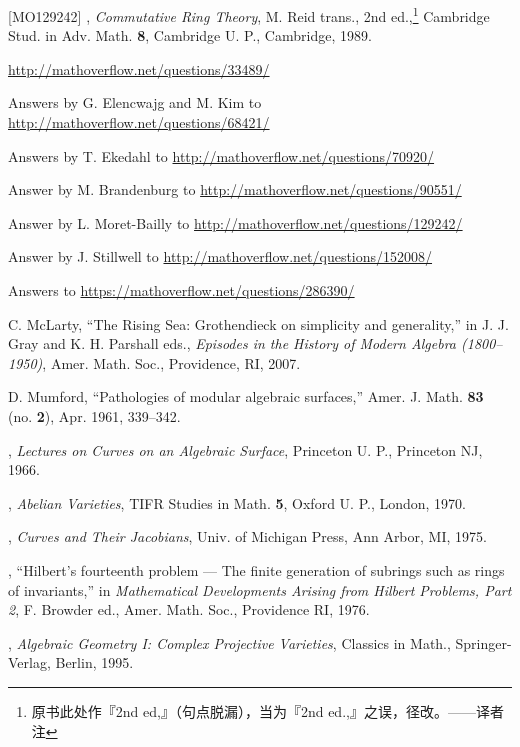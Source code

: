 \begin{thebibliography}{[MO129242]}
\sameauthor, \emph{Commutative Ring Theory}, M. Reid trans., 2nd ed.,\footnote
{原书此处作『2nd ed,』（句点脱漏），当为『2nd ed.,』之误，径改。——译者注}
Cambridge Stud. in Adv. Math. \textbf{8}, Cambridge U. P., Cambridge, 1989.

\url{http://mathoverflow.net/questions/33489/}

Answers by G. Elencwajg and M. Kim to
\url{http://mathoverflow.net/questions/68421/}

Answers by T. Ekedahl to \url{http://mathoverflow.net/questions/70920/}

Answer by M. Brandenburg to
\url{http://mathoverflow.net/questions/90551/}

Answer by L. Moret-Bailly to
\url{http://mathoverflow.net/questions/129242/}

Answer by J. Stillwell to
\url{http://mathoverflow.net/questions/152008/}

Answers to \url{https://mathoverflow.net/questions/286390/}

C. McLarty, ``The Rising Sea: Grothendieck on simplicity and generality,'' in
J. J. Gray and K. H. Parshall eds., \emph{Episodes in the History of Modern
Algebra (1800--1950)}, Amer. Math. Soc., Providence, RI, 2007.

D. Mumford, ``Pathologies of modular algebraic surfaces,'' Amer. J. Math.
\textbf{83} (no. \textbf{2}), Apr. 1961, 339--342.

\sameauthor, \emph{Lectures on Curves on an Algebraic Surface}, Princeton U.
P., Princeton NJ, 1966.

\sameauthor, \emph{Abelian Varieties}, TIFR Studies in Math. \textbf{5},
Oxford U. P., London, 1970.

\sameauthor, \emph{Curves and Their Jacobians}, Univ. of Michigan Press, Ann
Arbor, MI, 1975.

\sameauthor, ``Hilbert's fourteenth problem --- The finite generation of
subrings such as rings of invariants,'' in \emph{Mathematical Developments
Arising from Hilbert Problems, Part 2}, F. Browder ed., Amer. Math. Soc.,
Providence RI, 1976.

\sameauthor, \emph{Algebraic Geometry I: Complex Projective Varieties},
Classics in Math., Springer-Verlag, Berlin, 1995.


\end{thebibliography}
